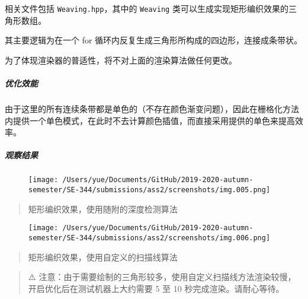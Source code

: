 \documentclass[
]{article}
\begin{document}
相关文件包括 \texttt{Weaving.hpp}，其中的 \texttt{Weaving}
类可以生成实现矩形编织效果的三角形数组。

其主要逻辑为在一个 for
循环内反复生成三角形所构成的四边形，连接成条带状。

为了体现渲染器的普适性，将不对上面的渲染算法做任何更改。

\hypertarget{header-n358}{%
\subparagraph{优化效能}\label{header-n358}}

由于这里的所有连续条带都是单色的（不存在颜色渐变问题），因此在栅格化方法内提供一个单色模式，在此时不去计算颜色插值，而直接采用提供的单色来提高效率。

\hypertarget{header-n363}{%
\subparagraph{观察结果}\label{header-n363}}

\begin{figure}
\centering
\texttt{[image: /Users/yue/Documents/GitHub/2019-2020-autumn-semester/SE-344/submissions/ass2/screenshots/img.005.png]}
\caption{}
\end{figure}

\begin{quote}
矩形编织效果，使用随附的深度检测算法
\end{quote}

\begin{figure}
\centering
\texttt{[image: /Users/yue/Documents/GitHub/2019-2020-autumn-semester/SE-344/submissions/ass2/screenshots/img.006.png]}
\caption{}
\end{figure}

\begin{quote}
矩形编织效果，使用自定义的扫描线算法
\end{quote}

\begin{quote}
⚠️
注意：由于需要绘制的三角形较多，使用自定义扫描线方法渲染较慢，开启优化后在测试机器上大约需要
5 至 10 秒完成渲染。请耐心等待。
\end{quote}
\end{document}
